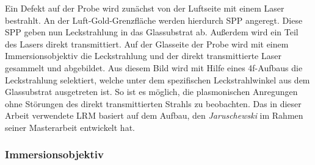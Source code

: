 \documentclass[titlepage]{article}
\begin{document}
	Ein Defekt auf der Probe wird zunächst von der Luftseite mit einem Laser bestrahlt. An der Luft-Gold-Grenzfläche werden hierdurch SPP angeregt. Diese SPP geben nun Leckstrahlung in das Glassubstrat ab.
	Außerdem wird ein Teil des Lasers direkt transmittiert. Auf der Glasseite der Probe wird mit einem Immersionsobjektiv die Leckstrahlung und der direkt transmittierte Laser gesammelt und abgebildet.	
	Aus diesem Bild wird mit Hilfe eines 4f-Aufbaus die Leckstrahlung selektiert, welche unter dem spezifischen Leckstrahlwinkel aus dem Glassubstrat ausgetreten ist. So ist es möglich, die plasmonischen Anregungen ohne Störungen des direkt transmittierten Strahls zu beobachten. Das in dieser Arbeit verwendete LRM basiert auf dem Aufbau, den \textit{Jaruschewski} im Rahmen seiner Masterarbeit \cite{Jaruschewski.2020} entwickelt hat.
	\subsubsection{Immersionsobjektiv}
\end{document}

